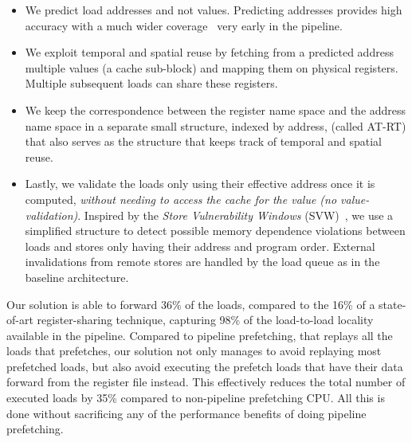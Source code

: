\documentclass{sig-alternate}
\begin{document}
\begin{itemize}
\item We predict load addresses and not values. Predicting addresses provides high accuracy with a much wider coverage~\cite{DLVP/sheikh17, AVPP/orosa18} very early in the pipeline.
\item We exploit temporal and spatial reuse by fetching from a predicted address multiple values (a cache sub-block) and mapping them on physical registers. Multiple subsequent loads can share these registers.
\item We keep the correspondence between the register name space and the address name space in a separate small structure, indexed by address, (called AT-RT) that also serves as the structure that keeps track of temporal and spatial reuse.
\item Lastly, we validate the loads only using their effective address once it is computed, \emph{without needing to access the cache for the value (no value-validation)}. 
Inspired by the \textit{Store Vulnerability Windows} (SVW)~\cite{SVW/roth05}, we use a simplified structure to detect possible memory dependence violations between loads and stores only having their address and program order. External invalidations from remote stores are handled by the load queue as in the baseline architecture.
\end{itemize}


Our solution is able to forward 36\% of the loads, compared to the 16\% of a state-of-art register-sharing technique, capturing 98\% of the load-to-load locality available in the pipeline. Compared to pipeline prefetching, that replays all the loads that prefetches, our solution not only manages to avoid replaying most prefetched loads, but also avoid executing the prefetch loads that have their data forward from the register file instead. This effectively reduces the total number of executed loads by 35\% compared to non-pipeline prefetching CPU. All this is done without sacrificing any of the performance benefits of doing pipeline prefetching.   
\end{document}
